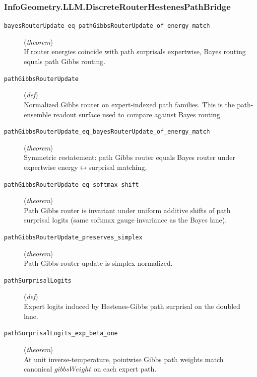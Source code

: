 \documentclass[11pt,a4paper]{article}
\begin{document}
\subsubsection*{InfoGeometry.LLM.DiscreteRouterHestenesPathBridge}
\begin{description}
  \item[\texttt{bayesRouterUpdate\_eq\_pathGibbsRouterUpdate\_of\_energy\_match}] (\textit{theorem}) \\ If router energies coincide with path surprisals expertwise, Bayes routing equals 
path Gibbs routing.
  \item[\texttt{pathGibbsRouterUpdate}] (\textit{def}) \\ Normalized Gibbs router on expert-indexed path families. 
This is the path-ensemble readout surface used to compare against Bayes routing.
  \item[\texttt{pathGibbsRouterUpdate\_eq\_bayesRouterUpdate\_of\_energy\_match}] (\textit{theorem}) \\ Symmetric restatement: path Gibbs router equals Bayes router under expertwise 
energy$\leftrightarrow $surprisal matching.
  \item[\texttt{pathGibbsRouterUpdate\_eq\_softmax\_shift}] (\textit{theorem}) \\ Path Gibbs router is invariant under uniform additive shifts of path surprisal 
logits (same softmax gauge invariance as the Bayes lane).
  \item[\texttt{pathGibbsRouterUpdate\_preserves\_simplex}] (\textit{theorem}) \\ Path Gibbs router update is simplex-normalized.
  \item[\texttt{pathSurprisalLogits}] (\textit{def}) \\ Expert logits induced by Hestenes-Gibbs path surprisal on the doubled lane.
  \item[\texttt{pathSurprisalLogits\_exp\_beta\_one}] (\textit{theorem}) \\ At unit inverse-temperature, pointwise Gibbs path weights match canonical 
$gibbsWeight$ on each expert path.
\end{description}
\end{document}
